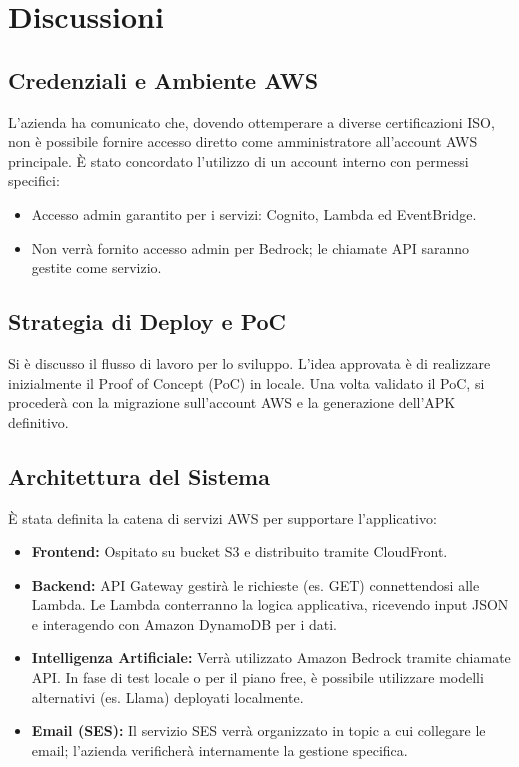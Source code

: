 \documentclass[a4paper,12pt]{article}
\begin{document}
\section{Discussioni}

\subsection{Credenziali e Ambiente AWS}
L'azienda ha comunicato che, dovendo ottemperare a diverse certificazioni ISO, non è possibile fornire accesso diretto come amministratore all'account AWS principale. È stato concordato l'utilizzo di un account interno con permessi specifici:
\begin{itemize}
    \item Accesso admin garantito per i servizi: Cognito, Lambda ed EventBridge.
    \item Non verrà fornito accesso admin per Bedrock; le chiamate API saranno gestite come servizio.
\end{itemize}

\subsection{Strategia di Deploy e PoC}
Si è discusso il flusso di lavoro per lo sviluppo. L'idea approvata è di realizzare inizialmente il Proof of Concept (PoC) in locale.
Una volta validato il PoC, si procederà con la migrazione sull'account AWS e la generazione dell'APK definitivo. 

\subsection{Architettura del Sistema}
È stata definita la catena di servizi AWS per supportare l'applicativo:
\begin{itemize}
    \item \textbf{Frontend:} Ospitato su bucket S3 e distribuito tramite CloudFront.
    \item \textbf{Backend:} API Gateway gestirà le richieste (es. GET) connettendosi alle Lambda. Le Lambda conterranno la logica applicativa, ricevendo input JSON e interagendo con Amazon DynamoDB per i dati.
    \item \textbf{Intelligenza Artificiale:} Verrà utilizzato Amazon Bedrock tramite chiamate API. In fase di test locale o per il piano free, è possibile utilizzare modelli alternativi (es. Llama) deployati localmente.
    \item \textbf{Email (SES):} Il servizio SES verrà organizzato in topic a cui collegare le email; l'azienda verificherà internamente la gestione specifica.
\end{itemize}
\end{document}
